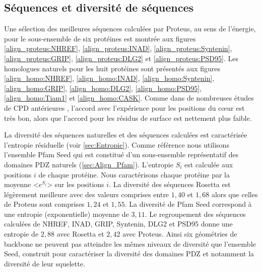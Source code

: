 \subsection{Séquences et diversité de séquences}
Une sélection des meilleures séquences calculées par Proteus, au sens de l'énergie, pour le sous-ensemble de six protéines est montrée aux figures \ref{align_proteus:NHREF}, \ref{align_proteus:INAD}, \ref{align_proteus:Syntenin}, \ref{align_proteus:GRIP}, \ref{align_proteus:DLG2} et \ref{align_proteus:PSD95}. Les homologues naturels pour les huit protéines sont présentés aux figures \ref{align_homo:NHREF}, \ref{align_homo:INAD}, \ref{align_homo:Syntenin}, \ref{align_homo:GRIP}, \ref{align_homo:DLG2}, \ref{align_homo:PSD95}, \ref{align_homo:Tiam1} et \ref{align_homo:CASK}. Comme dans de nombreuses études de CPD antérieures \cite{Jaramillo02,Dantas03}, l'accord avec l'expérience pour les positions du cœur est très bon, alors que l'accord pour les résidus de surface est nettement plus faible.

La diversité des séquences naturelles et des séquences calculées est caractérisée l'entropie résiduelle (voir \ref{sec:Entropie}). Comme référence nous utilisons l'ensemble Pfam Seed qui est constitué d'un sous-ensemble représentatif des domaines PDZ naturels (\ref{sec:Align_Pfam}). L'entropie $S_i$ est calculée aux positions $i$ de chaque protéine. Nous caractérisons chaque protéine par la moyenne <$e^{S_i}$> sur les positions $i$. La diversité des séquences Rosetta est légèrement meilleure avec des valeurs comprises entre $1,40$ et $1,68$ alors que celles de Proteus sont comprises $1,24$ et $1,55$. La diversité de Pfam Seed correspond à une entropie (exponentielle) moyenne de $3,11$. Le regroupement des séquences calculées de NHREF, INAD, GRIP, Syntenin, DLG2 et PSD95 donne une entropie de $2,88$ avec Rosetta et $2,42$ avec Proteus. Ainsi six géométries de backbone ne peuvent pas atteindre les mêmes niveaux de diversité que l'ensemble Seed, construit pour caractériser la diversité des domaines PDZ et notamment la diversité de leur squelette.


